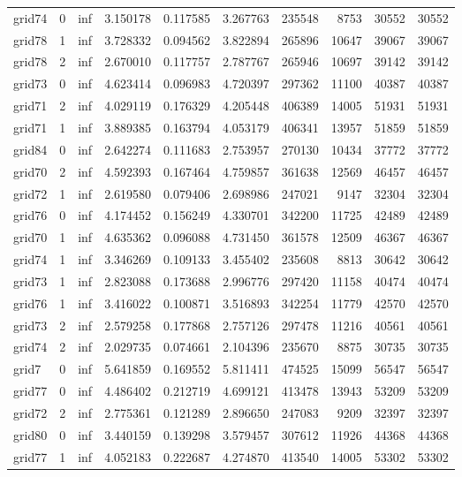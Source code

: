 \begin{longtable}{|l|r|r|r|r|r|r|r|r|r|}
grid74 & 0 & inf & 3.150178 & 0.117585 & 3.267763 & 235548 & 8753 & 30552 & 30552 \\
grid78 & 1 & inf & 3.728332 & 0.094562 & 3.822894 & 265896 & 10647 & 39067 & 39067 \\
grid78 & 2 & inf & 2.670010 & 0.117757 & 2.787767 & 265946 & 10697 & 39142 & 39142 \\
grid73 & 0 & inf & 4.623414 & 0.096983 & 4.720397 & 297362 & 11100 & 40387 & 40387 \\
grid71 & 2 & inf & 4.029119 & 0.176329 & 4.205448 & 406389 & 14005 & 51931 & 51931 \\
grid71 & 1 & inf & 3.889385 & 0.163794 & 4.053179 & 406341 & 13957 & 51859 & 51859 \\
grid84 & 0 & inf & 2.642274 & 0.111683 & 2.753957 & 270130 & 10434 & 37772 & 37772 \\
grid70 & 2 & inf & 4.592393 & 0.167464 & 4.759857 & 361638 & 12569 & 46457 & 46457 \\
grid72 & 1 & inf & 2.619580 & 0.079406 & 2.698986 & 247021 & 9147 & 32304 & 32304 \\
grid76 & 0 & inf & 4.174452 & 0.156249 & 4.330701 & 342200 & 11725 & 42489 & 42489 \\
grid70 & 1 & inf & 4.635362 & 0.096088 & 4.731450 & 361578 & 12509 & 46367 & 46367 \\
grid74 & 1 & inf & 3.346269 & 0.109133 & 3.455402 & 235608 & 8813 & 30642 & 30642 \\
grid73 & 1 & inf & 2.823088 & 0.173688 & 2.996776 & 297420 & 11158 & 40474 & 40474 \\
grid76 & 1 & inf & 3.416022 & 0.100871 & 3.516893 & 342254 & 11779 & 42570 & 42570 \\
grid73 & 2 & inf & 2.579258 & 0.177868 & 2.757126 & 297478 & 11216 & 40561 & 40561 \\
grid74 & 2 & inf & 2.029735 & 0.074661 & 2.104396 & 235670 & 8875 & 30735 & 30735 \\
grid7 & 0 & inf & 5.641859 & 0.169552 & 5.811411 & 474525 & 15099 & 56547 & 56547 \\
grid77 & 0 & inf & 4.486402 & 0.212719 & 4.699121 & 413478 & 13943 & 53209 & 53209 \\
grid72 & 2 & inf & 2.775361 & 0.121289 & 2.896650 & 247083 & 9209 & 32397 & 32397 \\
grid80 & 0 & inf & 3.440159 & 0.139298 & 3.579457 & 307612 & 11926 & 44368 & 44368 \\
grid77 & 1 & inf & 4.052183 & 0.222687 & 4.274870 & 413540 & 14005 & 53302 & 53302 \\

\end{longtable}
